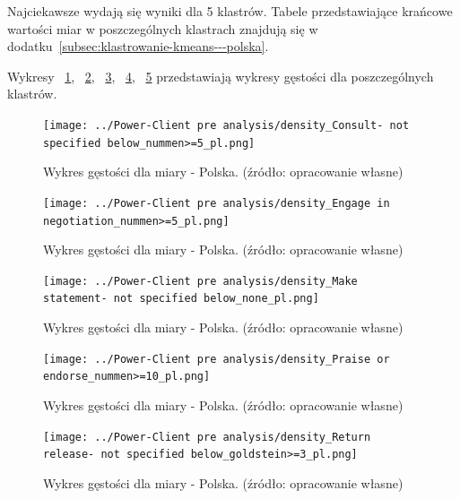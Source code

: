 \documentclass[11pt]{report}
\begin{document}
    Najciekawsze wydają się wyniki dla 5 klastrów.
    Tabele przedstawiające krańcowe wartości miar w poszczególnych klastrach znajdują się w dodatku~\ref{subsec:klastrowanie-kmeans---polska}.

    Wykresy
    ~\ref{fig:density_Consult- not specified below_nummen>=5_pl},
    ~\ref{fig:density_Engage in negotiation_nummen>=5_pl},
    ~\ref{fig:density_Make statement- not specified below_none_pl},
    ~\ref{fig:density_Praise or endorse_nummen>=10_pl},
    ~\ref{fig:density_Return release- not specified below_goldstein>=3_pl}
    przedstawiają wykresy gęstości dla poszczególnych klastrów.

    \begin{figure}[!htp]
        \centering
        \texttt{[image: ../Power-Client pre analysis/density\_Consult- not specified below\_nummen>=5\_pl.png]}
        \caption{Wykres gęstości dla miary - Polska. (źródło: opracowanie własne)}
        \label{fig:density_Consult- not specified below_nummen>=5_pl}
    \end{figure}
    \begin{figure}[!htp]
        \centering
        \texttt{[image: ../Power-Client pre analysis/density\_Engage in negotiation\_nummen>=5\_pl.png]}
        \caption{Wykres gęstości dla miary - Polska. (źródło: opracowanie własne)}
        \label{fig:density_Engage in negotiation_nummen>=5_pl}
    \end{figure}
    \begin{figure}[!htp]
        \centering
        \texttt{[image: ../Power-Client pre analysis/density\_Make statement- not specified below\_none\_pl.png]}
        \caption{Wykres gęstości dla miary - Polska. (źródło: opracowanie własne)}
        \label{fig:density_Make statement- not specified below_none_pl}
    \end{figure}
    \begin{figure}[!htp]
        \centering
        \texttt{[image: ../Power-Client pre analysis/density\_Praise or endorse\_nummen>=10\_pl.png]}
        \caption{Wykres gęstości dla miary - Polska. (źródło: opracowanie własne)}
        \label{fig:density_Praise or endorse_nummen>=10_pl}
    \end{figure}
    \begin{figure}[!htp]
        \centering
        \texttt{[image: ../Power-Client pre analysis/density\_Return release- not specified below\_goldstein>=3\_pl.png]}
        \caption{Wykres gęstości dla miary - Polska. (źródło: opracowanie własne)}
        \label{fig:density_Return release- not specified below_goldstein>=3_pl}
    \end{figure}
\end{document}
